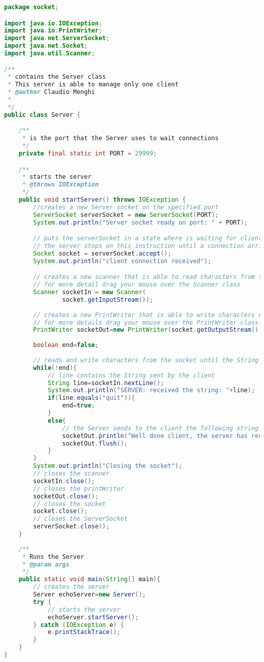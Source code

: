 \documentclass{article}
\begin{document}
\begin{lstlisting}[language=Java,escapechar=|]
package socket;

import java.io.IOException;
import java.io.PrintWriter;
import java.net.ServerSocket;
import java.net.Socket;
import java.util.Scanner;

/**
 * contains the Server class
 * This server is able to manage only one client
 * @author Claudio Menghi
 *
 */
public class Server {

	/**
	 * is the port that the Server uses to wait connections
	 */
	private final static int PORT = 29999;

	/**
	 * starts the server
	 * @throws IOException
	 */
	public void startServer() throws IOException {
		//creates a new Server socket on the specified port
		ServerSocket serverSocket = new ServerSocket(PORT);
		System.out.println("Server socket ready on port: " + PORT);

		// puts the serverSocket in a state where is waiting for client connections
		// the server stops on this instruction until a connection arrives
		Socket socket = serverSocket.accept();
		System.out.println("client connection received");

		// creates a new scanner that is able to read characters from the socket
		// for more detail drag your mouse over the Scanner class
		Scanner socketIn = new Scanner(
				socket.getInputStream());
		
		// creates a new PrintWriter that is able to write characters on the socket
		// for more details drag your mouse over the PrintWriter class
		PrintWriter socketOut=new PrintWriter(socket.getOutputStream());
		
		boolean end=false;
		
		// reads and write characters from the socket until the String quit is received
		while(!end){
			// line contains the String sent by the client
			String line=socketIn.nextLine();
			System.out.println("SERVER: received the string: "+line);
			if(line.equals("quit")){
				end=true;
			}
			else{
				// the Server sends to the client the following string
				socketOut.println("Well done client, the server has received the string: "+line);
				socketOut.flush();
			}
		}
		System.out.println("Closing the socket");
		// closes the scanner
		socketIn.close();
		// closes the printWriter
		socketOut.close();
		// closes the socket
		socket.close();
		// closes the ServerSocket
		serverSocket.close();
	}
	
	/**
	 * Runs the Server 
	 * @param args
	 */
	public static void main(String[] main){
		// creates the server
		Server echoServer=new Server();
		try {
			// starts the server
			echoServer.startServer();
		} catch (IOException e) {			
			e.printStackTrace();
		}
	}
}
\end{lstlisting}
\end{document}
